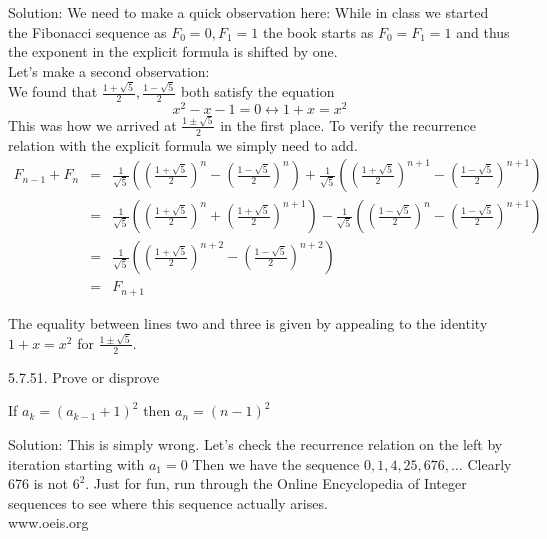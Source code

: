 \documentclass[16 pt]{amsart}
\theoremstyle{definition}
\theoremstyle{remark}
\numberwithin{equation}{section}
\begin{document}
\vspace{1in}

Solution: We need to make a quick observation here:  While in class we started the Fibonacci sequence as $F_0=0,F_1=1$ the book starts as $F_0=F_1=1$ and thus the exponent in the explicit formula is shifted by one.\\

Let's make a second observation:\\
We found that $\frac{1+\sqrt{5}}{2},\frac{1-\sqrt{5}}{2}$ both satisfy the equation
\[
x^2-x-1=0  \longleftrightarrow 1+x=x^2
\]
This was how we arrived at $\frac{1\pm\sqrt{5}}{2}$ in the first place. To verify the recurrence relation with the explicit formula we simply need to add.  
\begin{eqnarray*}
F_{n-1} + F_n & = & \frac{1}{\sqrt{5}}\left(\left(\frac{1+\sqrt{5}}{2}\right)^n-\left(\frac{1-\sqrt{5}}{2}\right)^{n}\right) + \frac{1}{\sqrt{5}}\left(\left(\frac{1+\sqrt{5}}{2}\right)^{n+1}-\left(\frac{1-\sqrt{5}}{2}\right)^{n+1}\right)\\
& = & \frac{1}{\sqrt{5}}\left(\left(\frac{1+\sqrt{5}}{2}\right)^{n}+\left(\frac{1+\sqrt{5}}{2}\right)^{n+1}\right) - \frac{1}{\sqrt{5}}\left(\left(\frac{1-\sqrt{5}}{2}\right)^{n}-\left(\frac{1-\sqrt{5}}{2}\right)^{n+1}\right)\\
& = & \frac{1}{\sqrt{5}}\left(\left(\frac{1+\sqrt{5}}{2}\right)^{n+2}-\left(\frac{1-\sqrt{5}}{2}\right)^{n+2}\right)\\
& = & F_{n+1}
\end{eqnarray*}

The equality between lines two and three is given by appealing to the identity $1+x=x^2$ for $\frac{1\pm\sqrt{5}}{2}$.



\newpage

5.7.51. Prove or disprove 

If $a_k = (a_{k-1} +1)^2$  then $a_n = (n-1)^2$

\vspace{1in}


Solution: This is simply wrong.  Let's check the recurrence relation on the left by iteration starting with $a_1=0$ Then we have the sequence $0,1,4,25,676,\dots$ Clearly 676 is not $6^2$.  Just for fun, run through the Online Encyclopedia of Integer sequences to see where this sequence actually arises.\\

www.oeis.org


\newpage
\end{document}
